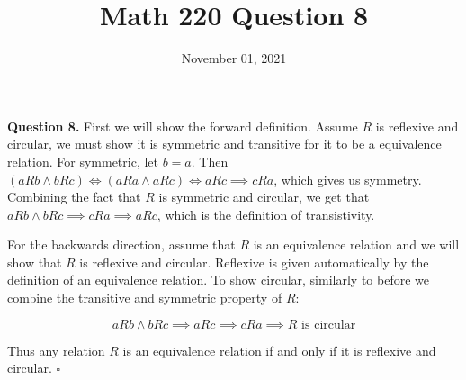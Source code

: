 \documentclass[letterpaper, reqno,11pt]{article}
\begin{document}
\title{Math 220 Question 8}
\date{November 01, 2021}
\maketitle

{\noindent\bf Question 8.} First we will show the forward definition. Assume $R$ is reflexive and circular, we must show it is symmetric and transitive for it to be a equivalence relation. For symmetric, let $b=a$. Then $(aRb\wedge bRc)\Leftrightarrow (aRa\wedge aRc)\Leftrightarrow aRc\implies cRa$, which gives us symmetry.  Combining the fact that $R$ is symmetric and circular, we get that $aRb\wedge bRc\implies cRa\implies aRc$, which is the definition of transistivity. 

For the backwards direction, assume that $R$ is an equivalence relation and we will show that $R$ is reflexive and circular. Reflexive is given automatically by the definition of an equivalence relation. To show circular, similarly to before we combine the transitive and symmetric property of $R$: 

$$
    aRb\wedge bRc\implies aRc\implies cRa\implies R\text{ is circular}
$$

Thus any relation $R$ is an equivalence relation if and only if it is reflexive and circular. $\square$
 
\end{document}
